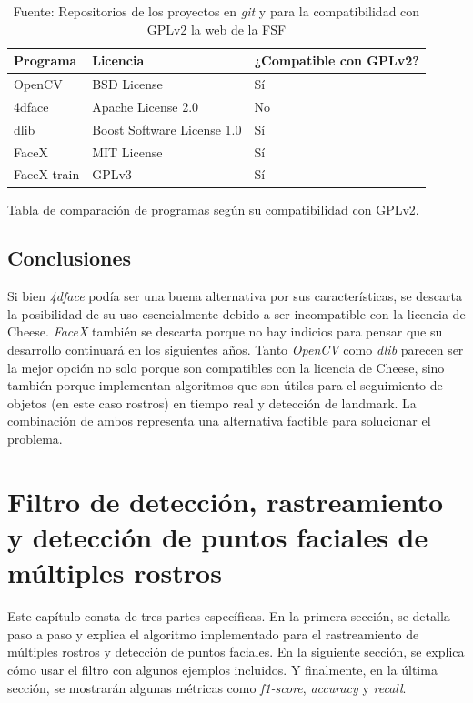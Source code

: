 \documentclass[a4paper,openright,12pt]{report}
\begin{document}
\begin{center}
	\begin{table}[h]
      \begin{tabular}{| l | l | l |}
      \hline
      Programa & Licencia & ¿Compatible con GPLv2? \\ \hline
      OpenCV & BSD License & Sí \\ \hline
      4dface & Apache License 2.0 & No \\ \hline
      dlib & Boost Software License 1.0 & Sí \\ \hline
      FaceX & MIT License & Sí \\ \hline
      FaceX-train & GPLv3 & Sí \\ \hline
      \end{tabular}
      \caption{Tabla de comparación de programas según su compatibilidad con GPLv2.}
      \caption*{Fuente: Repositorios de los proyectos en \textit{git}
                \cite{openCVLicense}\cite{dlibLicense2}\cite{faceXLicense}
                \cite{4dfaceLicense} y para la compatibilidad con GPLv2 la web de
                la FSF \cite{GPLv2Compatibility}}
	\end{table}
\end{center}


\section{Conclusiones}
Si bien \textit{4dface} podía ser una buena alternativa por sus características,
se descarta la posibilidad de su uso esencialmente debido a ser incompatible
con la licencia de Cheese. \textit{FaceX} también se descarta porque no hay
indicios para pensar que su desarrollo continuará en los siguientes años. Tanto
\textit{OpenCV} como \textit{dlib} parecen ser la mejor opción no solo porque
son compatibles con la licencia de Cheese, sino también porque implementan
algoritmos que son útiles para el seguimiento de objetos (en este caso rostros)
en tiempo real y detección de landmark. La combinación de ambos representa una
alternativa factible para solucionar el problema.

\chapter{Filtro de detección, rastreamiento y detección de puntos faciales de
  múltiples rostros}
Este capítulo consta de tres partes específicas. En la primera sección, se
detalla paso a paso y explica el algoritmo implementado para el rastreamiento de
múltiples rostros y detección de puntos faciales. En la siguiente sección, se
explica cómo usar el filtro con algunos ejemplos incluidos. Y finalmente, en la
última sección, se mostrarán algunas métricas como \textit{f1-score},
\textit{accuracy} y \textit{recall}.
\end{document}
